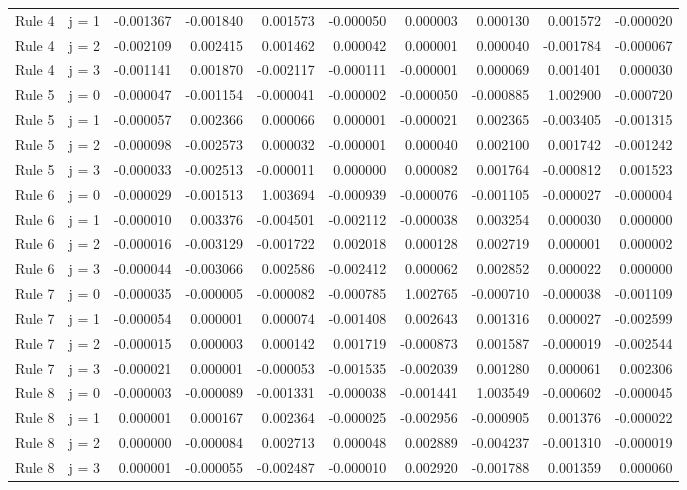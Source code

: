 {\begin{table}[htbp!]
\begin{tabular}{llrrrrrrrr}
    Rule 4 & j = 1 & -0.001367 & -0.001840 & 0.001573 & -0.000050 & 0.000003 & 0.000130 & 0.001572 & -0.000020 \\
    Rule 4 & j = 2 & -0.002109 & 0.002415 & 0.001462 & 0.000042 & 0.000001 & 0.000040 & -0.001784 & -0.000067 \\
    Rule 4 & j = 3 & -0.001141 & 0.001870 & -0.002117 & -0.000111 & -0.000001 & 0.000069 & 0.001401 & 0.000030 \\
    Rule 5 & j = 0 & -0.000047 & -0.001154 & -0.000041 & -0.000002 & -0.000050 & -0.000885 & 1.002900 & -0.000720 \\
    Rule 5 & j = 1 & -0.000057 & 0.002366 & 0.000066 & 0.000001 & -0.000021 & 0.002365 & -0.003405 & -0.001315 \\
    Rule 5 & j = 2 & -0.000098 & -0.002573 & 0.000032 & -0.000001 & 0.000040 & 0.002100 & 0.001742 & -0.001242 \\
    Rule 5 & j = 3 & -0.000033 & -0.002513 & -0.000011 & 0.000000 & 0.000082 & 0.001764 & -0.000812 & 0.001523 \\
    Rule 6 & j = 0 & -0.000029 & -0.001513 & 1.003694 & -0.000939 & -0.000076 & -0.001105 & -0.000027 & -0.000004 \\
    Rule 6 & j = 1 & -0.000010 & 0.003376 & -0.004501 & -0.002112 & -0.000038 & 0.003254 & 0.000030 & 0.000000 \\
    Rule 6 & j = 2 & -0.000016 & -0.003129 & -0.001722 & 0.002018 & 0.000128 & 0.002719 & 0.000001 & 0.000002 \\
    Rule 6 & j = 3 & -0.000044 & -0.003066 & 0.002586 & -0.002412 & 0.000062 & 0.002852 & 0.000022 & 0.000000 \\
    Rule 7 & j = 0 & -0.000035 & -0.000005 & -0.000082 & -0.000785 & 1.002765 & -0.000710 & -0.000038 & -0.001109 \\
    Rule 7 & j = 1 & -0.000054 & 0.000001 & 0.000074 & -0.001408 & 0.002643 & 0.001316 & 0.000027 & -0.002599 \\
    Rule 7 & j = 2 & -0.000015 & 0.000003 & 0.000142 & 0.001719 & -0.000873 & 0.001587 & -0.000019 & -0.002544 \\
    Rule 7 & j = 3 & -0.000021 & 0.000001 & -0.000053 & -0.001535 & -0.002039 & 0.001280 & 0.000061 & 0.002306 \\
    Rule 8 & j = 0 & -0.000003 & -0.000089 & -0.001331 & -0.000038 & -0.001441 & 1.003549 & -0.000602 & -0.000045 \\
    Rule 8 & j = 1 & 0.000001 & 0.000167 & 0.002364 & -0.000025 & -0.002956 & -0.000905 & 0.001376 & -0.000022 \\
    Rule 8 & j = 2 & 0.000000 & -0.000084 & 0.002713 & 0.000048 & 0.002889 & -0.004237 & -0.001310 & -0.000019 \\
    Rule 8 & j = 3 & 0.000001 & -0.000055 & -0.002487 & -0.000010 & 0.002920 & -0.001788 & 0.001359 & 0.000060 \\
    \bottomrule
    \end{tabular}%
\end{table}
}

 \label{lam: dk1 OAO}

 \label{lam: dk1 OAHO}